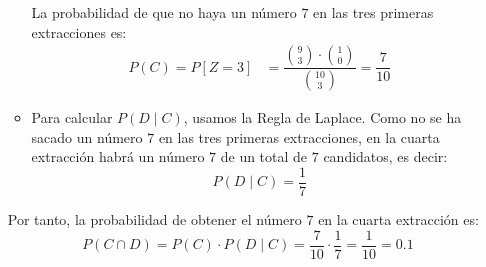 \begin{ejercicio}
\begin{enumerate}
\begin{itemize}
            La probabilidad de que no haya un número $7$ en las tres primeras extracciones es:
            \begin{align*}
                P(C) = P[Z=3] &= \dfrac{\binom{9}{3} \cdot \binom{1}{0}}{\binom{10}{3}} = \dfrac{7}{10}
            \end{align*}

            \item Para calcular $P(D\mid C)$, usamos la Regla de Laplace.
            Como no se ha sacado un número $7$ en las tres primeras extracciones, en la cuarta extracción habrá un número $7$ de un total de $7$ candidatos, es decir:
            \begin{equation*}
                P(D\mid C) = \dfrac{1}{7}
            \end{equation*}
        \end{itemize}

        Por tanto, la probabilidad de obtener el número $7$ en la cuarta extracción es:
        \begin{equation*}
            P(C\cap D) = P(C)\cdot P(D\mid C) = \dfrac{7}{10} \cdot \dfrac{1}{7} = \dfrac{1}{10} = 0.1
        \end{equation*}
    \end{enumerate}



\end{ejercicio}

